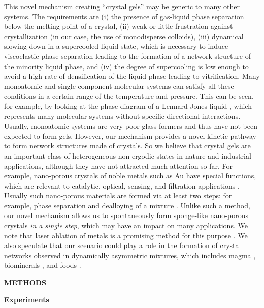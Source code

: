 \documentclass[preprint,amsmath,amssymb,superscriptaddress]{revtex4}
\begin{document}
This novel mechanism creating ``crystal gels'' may be generic to many other 
systems. The requirements are (i) the presence of gas-liquid phase separation below the melting point of a crystal, (ii) 
weak or little frustration against crystallization (in our case, the use of monodisperse colloids), 
(iii) dynamical slowing down in a supercooled liquid state, which is necessary to induce viscoelastic phase separation leading to the formation 
of a network structure of the minority liquid phase, and (iv) the degree of supercooling is low enough to avoid a high rate of densification of the liquid phase 
leading to vitrification.   
Many monoatomic and single-component molecular systems can satisfy all these conditions in a certain range of the temperature and pressure. 
This can be seen, for example, by looking at the phase diagram of a Lennard-Jones liquid \cite{lodge1997brownian}, which represents many molecular systems 
without specific directional interactions. 
Usually, monoatomic systems are very poor glass-formers and thus have not been expected to form gels. 
However, our mechanism provides a novel kinetic pathway to form network structures made of crystals.  
So we believe that crystal gels are an important class of heterogeneous non-ergodic states in nature 
and industrial applications, although they have not attracted much attention so far.  
For example, nano-porous crystals of noble metals such as Au have special functions, which are relevant to catalytic, optical, sensing, and filtration applications 
\cite{ding2004nanoporous, ding2009nanoporous, wittstock2010nanoporous}. Usually such nano-porous materials are formed via at least two steps: for example, phase separation and dealloying of a mixture
\cite{erlebacher2001evolution}. Unlike such a method, our novel mechanism allows us to spontaneously form sponge-like nano-porous crystals \emph{in a single step}, 
which may have an impact on many applications. 
We note that laser ablation of metals is a promising method for this purpose \cite{povarnitsyn2013mechanisms}.
We also speculate that our scenario could play a role in the formation of crystal networks observed in dynamically asymmetric mixtures, 
which includes magma \cite{philpotts1998role}, biominerals \cite{rousseau2005multiscale}, and foods \cite{deman1987fat}. 

\vspace{1cm}
\noindent
{\bf METHODS}

\noindent
{\bf Experiments}
\end{document}
